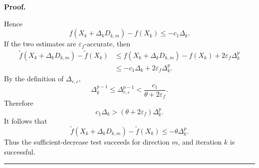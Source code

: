 \documentclass[11pt,a4paper]{article}
\newtheorem{lemma}{Lemma}[section]
\newenvironment{proof}[1][Proof]{%
  \par\noindent\textbf{#1.}\ %
}{%
  \par\vspace{-0.5 ex}            %
  \noindent\hfill\rule{0.5em}{0.5em}\par
  \vspace{1ex}
}
\newcommand{\Dexp}{p}
\newcommand{\goldelta}{r}
\begin{document}
\begin{proof}
\[\]
Hence
\[
    f(X_k+\Delta_kD_{k,m})-f(X_k)
    \le
    -c_1\Delta_k.
\]
If the two estimates are \(\varepsilon_f\)-accurate, then
\[
\begin{aligned}
    \tilde f(X_k+\Delta_kD_{k,m})-\tilde f(X_k)
    &\le
    f(X_k+\Delta_kD_{k,m})-f(X_k)
    +
    2\varepsilon_f\Delta_k^{\Dexp}                                           \\
    &\le
    -c_1\Delta_k
    +
    2\varepsilon_f\Delta_k^{\Dexp}.
\end{aligned}
\]
By the definition of \(\Delta_{\goldelta,\varepsilon}\),
\[
    \Delta_k^{\Dexp-1}
    \le
    \Delta_{\goldelta,\varepsilon}^{\Dexp-1}
    <
    \frac{c_1}{\theta+2\varepsilon_f}.
\]
Therefore
\[
    c_1\Delta_k
    >
    (\theta+2\varepsilon_f)\Delta_k^{\Dexp}.
\]
It follows that
\[
    \tilde f(X_k+\Delta_kD_{k,m})-\tilde f(X_k)
    \le
    -\theta\Delta_k^{\Dexp}.
\]
Thus the sufficient-decrease test succeeds for direction \(m\), and iteration
\(k\) is successful.
\end{proof}



\end{document}
